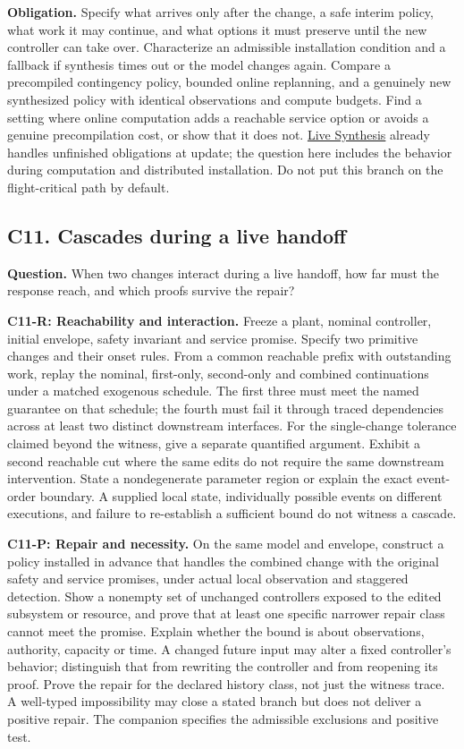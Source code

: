 \documentclass[11pt]{article}
\begin{document}
\textbf{Obligation.} Specify what arrives only after the change, a safe interim policy, what work it may continue, and what options it must preserve until the new controller can take over. Characterize an admissible installation condition and a fallback if synthesis times out or the model changes again. Compare a precompiled contingency policy, bounded online replanning, and a genuinely new synthesized policy with identical observations and compute budgets. Find a setting where online computation adds a reachable service option or avoids a genuine precompilation cost, or show that it does not. \href{https://arxiv.org/abs/2107.01136}{Live Synthesis} already handles unfinished obligations at update; the question here includes the behavior during computation and distributed installation. Do not put this branch on the flight-critical path by default.

\subsection{C11. Cascades during a live handoff}
\label{sec:cascade}
\textbf{Question.} When two changes interact during a live handoff, how far must the response reach, and which proofs survive the repair?

\textbf{C11-R: Reachability and interaction.} Freeze a plant, nominal controller, initial envelope, safety invariant and service promise. Specify two primitive changes and their onset rules. From a common reachable prefix with outstanding work, replay the nominal, first-only, second-only and combined continuations under a matched exogenous schedule. The first three must meet the named guarantee on that schedule; the fourth must fail it through traced dependencies across at least two distinct downstream interfaces. For the single-change tolerance claimed beyond the witness, give a separate quantified argument. Exhibit a second reachable cut where the same edits do not require the same downstream intervention. State a nondegenerate parameter region or explain the exact event-order boundary. A supplied local state, individually possible events on different executions, and failure to re-establish a sufficient bound do not witness a cascade.

\textbf{C11-P: Repair and necessity.} On the same model and envelope, construct a policy installed in advance that handles the combined change with the original safety and service promises, under actual local observation and staggered detection. Show a nonempty set of unchanged controllers exposed to the edited subsystem or resource, and prove that at least one specific narrower repair class cannot meet the promise. Explain whether the bound is about observations, authority, capacity or time. A changed future input may alter a fixed controller's behavior; distinguish that from rewriting the controller and from reopening its proof. Prove the repair for the declared history class, not just the witness trace. A well-typed impossibility may close a stated branch but does not deliver a positive repair. The companion specifies the admissible exclusions and positive test.
\end{document}
